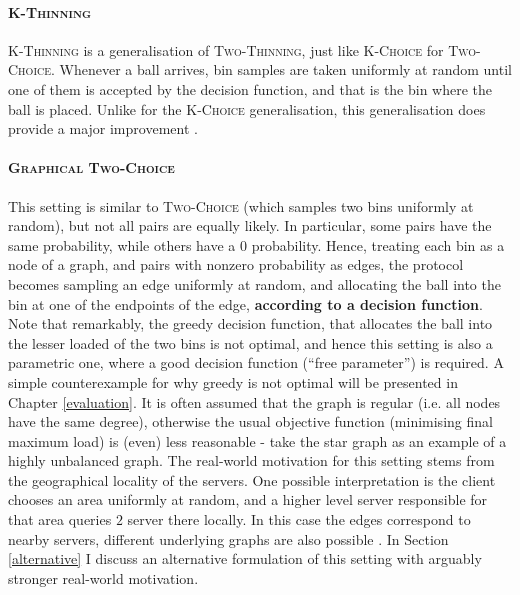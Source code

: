 \paragraph{\textsc{K-Thinning}}


\textsc{K-Thinning} is a generalisation of \textsc{Two-Thinning}, just like \textsc{K-Choice} for \textsc{Two-Choice}. Whenever a ball arrives, bin samples are taken uniformly at random until one of them is accepted by the decision function, and that is the bin where the ball is placed. Unlike for the \textsc{K-Choice} generalisation, this generalisation does provide a major improvement \cite{feldheim2020dthinning}.


\paragraph{\textsc{Graphical Two-Choice}}

This setting is similar to \textsc{Two-Choice} (which samples two bins uniformly at random), but not all pairs are equally likely. In particular, some pairs have the same probability, while others have a $0$ probability. Hence, treating each bin as a node of a graph, and pairs with nonzero probability as edges, the protocol becomes sampling an edge uniformly at random, and allocating the ball into the bin at one of the endpoints of the edge, \textbf{according to a decision function}. Note that remarkably, the greedy decision function, that allocates the ball into the lesser loaded of the two bins is not optimal, and hence this setting is also a parametric one, where a good decision function (``free parameter'') is required. A simple counterexample for why greedy is not optimal will be presented in Chapter \ref{evaluation}. It is often assumed that the graph is regular (i.e. all nodes have the same degree), otherwise the usual objective function (minimising final maximum load) is (even) less reasonable - take the star graph as an example of a highly unbalanced graph. The real-world motivation for this setting stems from the geographical locality of the servers. One possible interpretation is the client chooses an area uniformly at random, and a higher level server responsible for that area queries $2$ server there locally. In this case the edges correspond to nearby servers, different underlying graphs are also possible \cite{peres2015oneplusbeta}. In Section \ref{alternative} I discuss an alternative formulation of this setting with arguably stronger real-world motivation.

